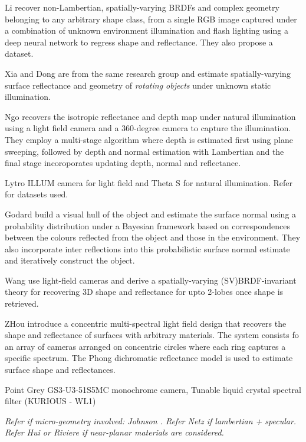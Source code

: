 \dagg Li \etal \cite{li2018learning} recover non-Lambertian, spatially-varying BRDFs and complex geometry belonging to any arbitrary shape class, from a single RGB image captured under a combination of unknown environment illumination and
flash lighting using a deep neural network to regress shape and reflectance. They also propose a dataset.


\dagg Xia \etal \cite{xia2016recovering} and Dong \etal \cite{dong2014appearance} are from the same research group and estimate spatially-varying surface reflectance and geometry of \textit{rotating objects} under unknown static illumination. 

\dagg Ngo \etal \cite{ngo2019reflectance} recovers the isotropic reflectance and depth map under natural illumination using a light field camera and a 360-degree camera to capture the illumination. They employ a multi-stage algorithm where depth is estimated first using plane sweeping, followed by depth and normal estimation with Lambertian and the final stage incoroporates updating depth, normal and reflectance.

\hardware Lytro ILLUM camera for light field and Theta S for natural illumination. Refer for datasets used. 

Godard \etal \cite{godard2015multi} build a visual hull of the object and estimate the surface normal using a probability distribution under a Bayesian framework based on correspondences between the colours reflected from the object and those in the environment. They also incorporate inter reflections into this probabilistic surface normal estimate and iteratively construct the object. 

Wang \etal \cite{wang2016svbrdf} use light-field cameras and derive a spatially-varying (SV)BRDF-invariant theory for recovering 3D shape and reflectance for upto 2-lobes once shape is retrieved.

ZHou \etal \cite{zhou2019non} introduce a concentric multi-spectral light field design that recovers the shape and reflectance of surfaces with arbitrary materials. The system consists fo an array of cameras arranged on concentric circles where each ring captures a specific spectrum. The Phong dichromatic reflectance model is used to estimate surface shape and reflectances.

\hardware Point Grey GS3-U3-51S5MC monochrome camera, Tunable liquid crystal spectral filter (KURIOUS - WL1) 

\textit{Refer if micro-geometry involved: Johnson \etal \cite{johnson2011microgeometry}. Refer Netz \etal \cite{netz2012recognition} if lambertian + specular. Refer Hui \etal or Riviere \etal \cite{hui2017reflectance, riviere2016mobile} if near-planar materials are considered.}
